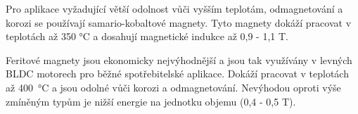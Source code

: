  Pro aplikace vyžadující větší odolnost vůči vyšším teplotám, odmagnetování a korozi se používají samario-kobaltové magnety. 
 Tyto magnety dokáží pracovat v teplotách až 350 °C a dosahují magnetické indukce až 0,9 - 1,1 T. 

Feritové magnety jsou ekonomicky nejvýhodnější a jsou tak využívány v levných BLDC motorech pro běžné spotřebitelské aplikace. 
Dokáží pracovat v teplotách až 400~°C a jsou odolné vůči korozi a odmagnetování.
Nevýhodou oproti výše zmíněným typům je nižší energie na jednotku objemu (0,4 - 0,5 T).



 
